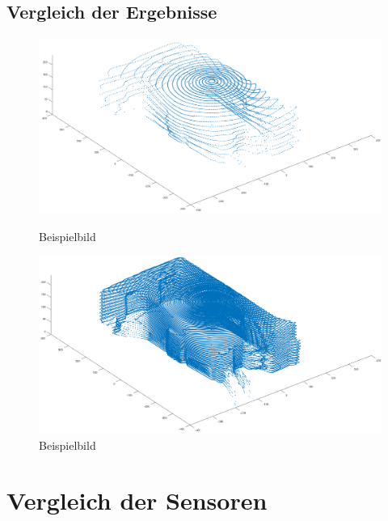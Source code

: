  


\subsection{Vergleich der Ergebnisse}


\begin{figure}[htb]
	\centering
	\begin{minipage}[t]{0.45\linewidth}
		\centering
		\includegraphics[width=1.2\linewidth]{images/Validierung/Aufloesungen/niedrig.png}
		\caption{Beispielbild}
	\end{minipage}
	\hfill
	\begin{minipage}[t]{0.45\linewidth}
		\centering
		\includegraphics[width=1.2\linewidth]{images/Validierung/Aufloesungen/hoch.png}
		\caption{Beispielbild}
	\end{minipage}
\end{figure}






\section{Vergleich der Sensoren}